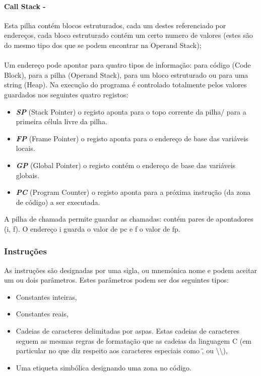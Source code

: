 \documentclass{report}
\begin{document}
\paragraph{\quad Call Stack -}
Esta pilha contém blocos estruturados, cada um destes referenciado por endereços, cada bloco
estruturado contém um certo numero de valores (estes são do mesmo tipo dos que se podem encontrar na Operand Stack);
\\
\\
\null\quad Um endereço pode apontar para quatro tipos de informação: para código (Code Block), para a
pilha (Operand Stack), para um bloco estruturado ou para uma string (Heap).
Na execução do programa é controlado totalmente pelos valores guardados nos seguintes quatro registos:
\begin{itemize}
	\item \textit{\textbf{SP}} (Stack Pointer) o registo aponta para o topo corrente da pilha/ para a primeira célula livre da pilha.
	\item \textit{\textbf{FP}} (Frame Pointer) o registo aponta para o endereço de base das variáveis locais.
	\item \textit{\textbf{GP}} (Global Pointer) o registo contém o endereço de base das variáveis globais.
	\item \textit{\textbf{PC}} (Program Counter) o registo aponta para a próxima instrução (da zona de código) a ser executada.
\end{itemize}

A pilha de chamada permite guardar as chamadas: contém pares de apontadores
(i, f). O endereço i guarda o valor de pc e f o valor de fp.

\subsubsection{Instruções}

\quad As instruções são designadas por uma sigla, ou mnemónica nome e podem aceitar um ou dois parâmetros.
Estes parâmetros podem ser dos seguintes tipos:
\begin{itemize}
\item Constantes inteiras,
\item Constantes reais,
\item Cadeias de caracteres delimitadas por aspas. Estas cadeias de caracteres seguem as
mesmas regras de formatação que as cadeias da linguagem C (em particular no que
diz respeito aos caracteres especiais como \", \n ou \textbackslash\textbackslash ),
\item Uma etiqueta simbólica designando uma zona no código.
\end{itemize}
\end{document}
